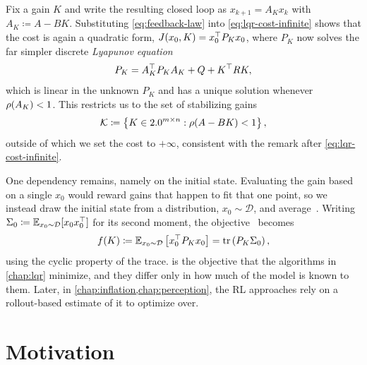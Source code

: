 Fix a gain $K$ and write the resulting closed loop as
$x_{k+1} = A_K x_k$ with $A_K \coloneqq A - BK$. Substituting
\eqref{eq:feedback-law} into \eqref{eq:lqr-cost-infinite} shows that the cost is
again a quadratic form, $J(x_0, K) = x_0^{\top} P_K x_0$, where $P_K$ now solves
the far simpler discrete \emph{Lyapunov equation}~\cite[Sec.~2.1]{Fazel2018Global}
\begin{equation}
    \label{eq:lyapunov}
    P_K = A_K^{\top} P_K A_K + Q + K^{\top} R K ,
\end{equation}
which is linear in the unknown $P_K$ and has a unique solution whenever
$\operatorname{\rho}(A_K) < 1$. This restricts us to the set of stabilizing gains
\begin{equation}
    \label{eq:stabilizing-set}
    \mathcal{K} \coloneqq \left\{ K \in 2.0^{m \times n} : \operatorname{\rho}(A - BK) < 1 \right\} ,
\end{equation}
outside of which we set the cost to $+\infty$, consistent with the remark after
\eqref{eq:lqr-cost-infinite}.

One dependency remains, namely on the initial state. Evaluating the gain
based on a single $x_0$ would reward gains that happen to fit that one
point, so we instead draw the initial state from a distribution,
$x_0 \sim \mathcal{D}$, and average~\cite[Sec.~3]{Fazel2018Global}. Writing
$\Sigma_0 \coloneqq \mathbb{E}_{x_0 \sim \mathcal{D}}[x_0 x_0^{\top}]$ for its second moment,
the objective~\cite[Sec.~2.1]{Fazel2018Global} becomes
\begin{equation}
    \label{eq:cost-of-gain}
    f(K) \coloneqq \mathbb{E}_{x_0 \sim \mathcal{D}} \left[ x_0^{\top} P_K x_0 \right]
    = \operatorname{tr} \left( P_K \Sigma_0 \right) ,
\end{equation}
using the cyclic property of the trace.  is the objective
that the algorithms in \cref{chap:lqr} minimize, and they differ
only in how much of the model is known to them. Later, in \cref{chap:inflation,chap:perception},
the RL approaches rely on a rollout-based estimate of it to optimize over.


\section{Motivation}
\label{sec:motivation}

